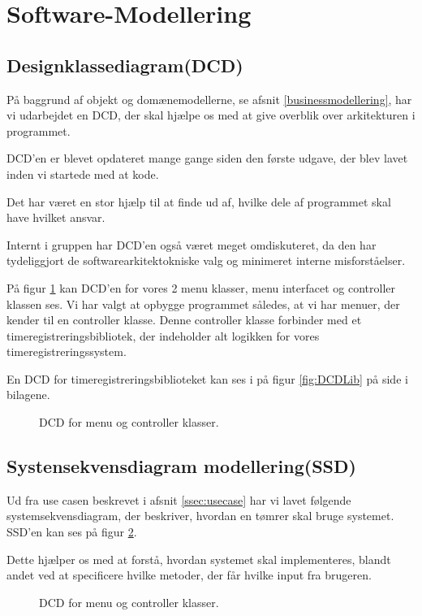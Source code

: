 \section{Software-Modellering}\label{softwaremodellering}

\subsection{Designklassediagram(DCD)}

På baggrund af objekt og domænemodellerne, se afsnit \ref{businessmodellering}, har vi udarbejdet en DCD, der skal hjælpe os med at give overblik over arkitekturen i programmet.

DCD'en er blevet opdateret mange gange siden den første udgave, der blev lavet inden vi startede med at kode.

Det har været en stor hjælp til at finde ud af, hvilke dele af programmet skal have hvilket ansvar.

Internt i gruppen har DCD'en også været meget omdiskuteret, da den har tydeliggjort de softwarearkitektokniske valg og minimeret interne misforståelser.


På figur \ref{fig:DCDMenu} kan DCD'en for vores 2 menu klasser, menu interfacet og controller klassen ses.
Vi har valgt at opbygge programmet således, at vi har menuer, der kender til en controller klasse.
Denne controller klasse forbinder med et timeregistreringsbibliotek, der indeholder alt logikken for vores timeregistreringssystem.

En DCD for timeregistreringsbiblioteket kan ses i på figur \ref{fig:DCDLib} på side \pageref{fig:DCDLib} i bilagene.

\begin{figure}[H]
    \caption{DCD for menu og controller klasser.}
    \label{fig:DCDMenu}
\end{figure}

\subsection{Systensekvensdiagram modellering(SSD)}

Ud fra use casen beskrevet i afsnit \ref{ssec:usecase} har vi lavet følgende systemsekvensdiagram, der beskriver, hvordan en tømrer skal bruge systemet. SSD'en kan ses på figur \ref{fig:SSDMain}.

Dette hjælper os med at forstå, hvordan systemet skal implementeres, blandt andet ved at specificere hvilke metoder, der får hvilke input fra brugeren.
\begin{figure}[H]
    \caption{DCD for menu og controller klasser.}
    \label{fig:SSDMain}
\end{figure}

